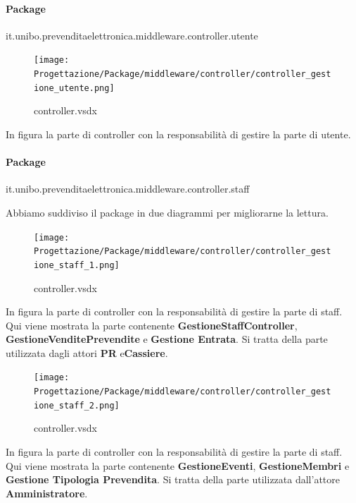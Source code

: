 \documentclass[a4paper]{article}
\begin{document}
\newpage

\paragraph{Package} it.unibo.prevenditaelettronica.middleware.controller.utente


\begin{figure}[H]
    \texttt{[image: Progettazione/Package/middleware/controller/controller\_gestione\_utente.png]}
    \centering
    \caption{controller.vsdx}
\end{figure}

In figura la parte di controller con la responsabilità di gestire la parte di utente.

\paragraph{Package} it.unibo.prevenditaelettronica.middleware.controller.staff


Abbiamo suddiviso il package in due diagrammi per migliorarne la lettura.

\begin{figure}[H]
    \texttt{[image: Progettazione/Package/middleware/controller/controller\_gestione\_staff\_1.png]}
    \centering
    \caption{controller.vsdx}
\end{figure}

In figura la parte di controller con la responsabilità di gestire la parte di staff. Qui viene mostrata la parte contenente \textbf{GestioneStaffController}, \textbf{GestioneVenditePrevendite} e \textbf{Gestione Entrata}. Si tratta della parte utilizzata dagli attori \textbf{PR} e\textbf{Cassiere}.\\

\begin{figure}[H]
    \texttt{[image: Progettazione/Package/middleware/controller/controller\_gestione\_staff\_2.png]}
    \centering
    \caption{controller.vsdx}
\end{figure}

In figura la parte di controller con la responsabilità di gestire la parte di staff. Qui viene mostrata la parte contenente \textbf{GestioneEventi}, \textbf{GestioneMembri} e \textbf{Gestione Tipologia Prevendita}. Si tratta della parte utilizzata dall'attore \textbf{Amministratore}.
\end{document}
